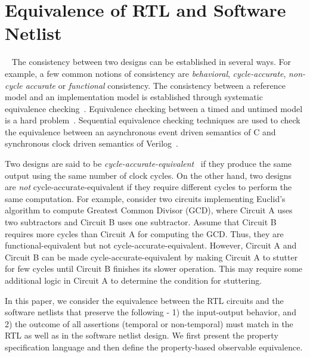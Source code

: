 \section{Equivalence of RTL and Software Netlist}~\label{eq-sw-hw}
%
The consistency between two designs can be established in several ways. 
For example, a few common notions of consistency are \emph{behavioral}, 
\emph{cycle-accurate}, \emph{non-cycle accurate} or \emph{functional}
consistency.  The consistency between a reference model and an implementation
model is established through systematic equivalence 
checking~\cite{CKY03,DBLP:conf/date/KoelblJJP09,DBLP:journals/tcad/StoffelK04,
DBLP:conf/date/Eijk98,DBLP:conf/iccd/BaumgartnerMPKJ06}.  Equivalence checking between a timed and untimed model is a hard
problem~\cite{kuehlmann2002combinational}.  Sequential equivalence checking techniques 
are used to check the equivalence between an asynchronous event driven semantics of C and synchronous 
clock driven semantics of Verilog~\cite{CKY03, DBLP:conf/iccd/BaumgartnerMPKJ06}.


Two designs are said to be \emph{cycle-accurate-equivalent}~\cite{cycle,kuehlmann2002combinational} 
if they produce the same output using the same number of clock cycles.   
On the other hand, two designs are \emph{not} cycle-accurate-equivalent if they require 
different cycles to perform the same computation. For example, consider two circuits
implementing Euclid's algorithm to compute Greatest Common Divisor (GCD),
where Circuit A uses two subtractors and Circuit B uses one subtractor. Assume that 
Circuit B requires more cycles than Circuit A for computing the GCD. Thus,
they are functional-equivalent but not cycle-accurate-equivalent. However,
Circuit A and Circuit B can be made cycle-accurate-equivalent by making Circuit
A to stutter for few cycles until Circuit B finishes its slower operation.  This
may require some additional logic in Circuit A to determine the condition for 
stuttering.  


In this paper, we consider the equivalence between the RTL circuits and the 
software netlists that preserve the following - 1) the input-output behavior, and 
2) the outcome of all assertions (temporal or non-temporal) must match in the RTL 
as well as in the software netlist design.  
% 
We first present the property specification language and then define the 
property-based observable equivalence. 
% 
